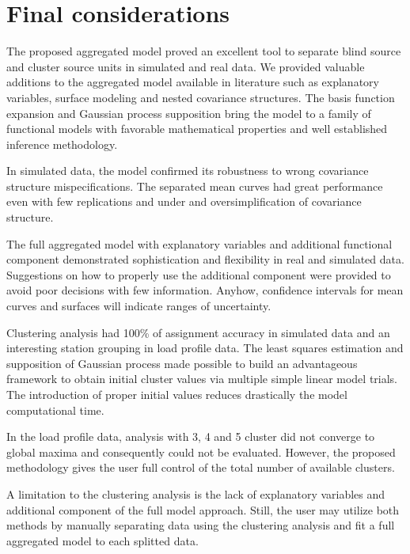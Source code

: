 \chapter{Final considerations}

The proposed aggregated model proved an excellent tool to separate blind source and cluster source units in simulated and real data. We provided valuable additions to the aggregated model available in literature such as explanatory variables, surface modeling and nested covariance structures. The basis function expansion and Gaussian process supposition bring the model to a family of functional models with favorable mathematical properties and well established inference methodology. 

In simulated data, the model confirmed its robustness to wrong covariance structure mispecifications. The separated mean curves had great performance even with few replications and under and oversimplification of covariance structure. 

The full aggregated model with explanatory variables and additional functional component demonstrated  sophistication and flexibility in real and simulated data. Suggestions on how to properly use the additional component were provided to avoid poor decisions with few information. Anyhow, confidence intervals for mean curves and surfaces will indicate ranges of uncertainty.

Clustering analysis had 100\% of assignment accuracy in simulated data and an interesting station grouping in load profile data. The least squares estimation and supposition of Gaussian process made possible to build an advantageous framework to obtain initial cluster values via multiple simple linear model trials. The introduction of proper initial values reduces drastically the model computational time.

In the load profile data, analysis with 3, 4 and 5 cluster did not converge to global maxima and consequently could not be evaluated. However, the proposed methodology gives the user full control of the total number of available clusters.

A limitation to the clustering analysis is the lack of explanatory variables and additional component of the full model approach. Still, the user may utilize both methods by manually separating data using the clustering analysis and fit a full aggregated model to each splitted data. 


